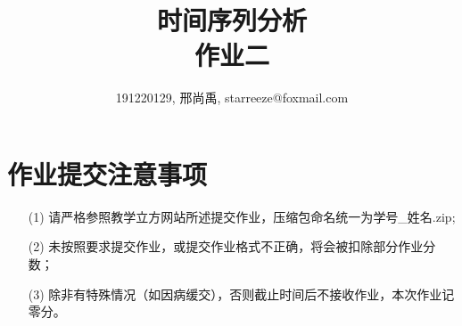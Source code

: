 \documentclass[a4paper,UTF8]{article}
\numberwithin{equation}{section}
\begin{document}
\title{时间序列分析\\
作业二}
\author{191220129, 邢尚禹, starreeze@foxmail.com}
\maketitle

\section*{作业提交注意事项}
\begin{tcolorbox}
\begin{enumerate}
  \item[(1)] 请严格参照教学立方网站所述提交作业，压缩包命名统一为{\color{red}学号\_姓名.zip};
  \item[(2)] 未按照要求提交作业，或提交作业格式不正确，将会被扣除部分作业分数；
  \item[(3)] 除非有特殊情况（如因病缓交），否则截止时间后不接收作业，本次作业记零分。
\end{enumerate}
\end{tcolorbox}
\end{document}
